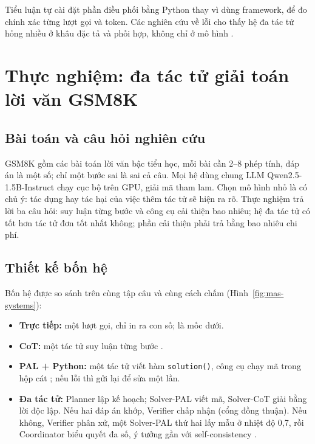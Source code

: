 Tiểu luận tự cài đặt phần điều phối bằng Python thay vì dùng framework, để đo chính xác từng lượt gọi và token. Các nghiên cứu về lỗi cho thấy hệ đa tác tử hỏng nhiều ở khâu đặc tả và phối hợp, không chỉ ở mô hình \cite{ch7:cemri2025}.

\section{Thực nghiệm: đa tác tử giải toán lời văn GSM8K}\label{sec:mas-exp}
\subsection{Bài toán và câu hỏi nghiên cứu}
GSM8K \cite{ch1:cobbe2021} gồm các bài toán lời văn bậc tiểu học, mỗi bài cần 2--8 phép tính, đáp án là một số; chỉ một bước sai là sai cả câu. Mọi hệ dùng chung LLM Qwen2.5-1.5B-Instruct \cite{ch5:qwen2024} chạy cục bộ trên GPU, giải mã tham lam. Chọn mô hình nhỏ là có chủ ý: tác dụng hay tác hại của việc thêm tác tử sẽ hiện ra rõ. Thực nghiệm trả lời ba câu hỏi: suy luận từng bước và công cụ cải thiện bao nhiêu; hệ đa tác tử có tốt hơn tác tử đơn tốt nhất không; phần cải thiện phải trả bằng bao nhiêu chi phí.

\subsection{Thiết kế bốn hệ}
Bốn hệ được so sánh trên cùng tập câu và cùng cách chấm (Hình~\ref{fig:mas-systems}):
\begin{itemize}
  \item \textbf{Trực tiếp:} một lượt gọi, chỉ in ra con số; là mốc dưới.
  \item \textbf{CoT:} một tác tử suy luận từng bước \cite{ch1:wei2022}.
  \item \textbf{PAL + Python:} một tác tử viết hàm \texttt{solution()}, công cụ chạy mã trong hộp cát \cite{ch7:gao2023pal}; nếu lỗi thì gửi lại để sửa một lần.
  \item \textbf{Đa tác tử:} Planner lập kế hoạch; Solver-PAL viết mã, Solver-CoT giải bằng lời độc lập. Nếu hai đáp án khớp, Verifier chấp nhận (cổng đồng thuận). Nếu không, Verifier phân xử, một Solver-PAL thứ hai lấy mẫu ở nhiệt độ 0,7, rồi Coordinator biểu quyết đa số, ý tưởng gần với self-consistency \cite{ch7:wang2023sc}.
\end{itemize}


